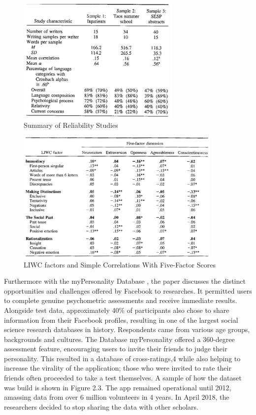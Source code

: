\begin{figure}[H]
\centering
\includegraphics[width=8cm]{Table1}
\caption{Summary of Reliability Studies}
\end{figure}

\begin{figure}[H]
\centering
\includegraphics[width=10cm]{Table2}
\caption{LIWC factors and Simple Correlations With Five-Factor Scores}
\end{figure}
Furthermore with the myPersonality Database \cite{kosinski2015facebook}, the paper discusses the distinct opportunities and challenges offered by Facebook to researches. It permitted users to complete genuine psychometric assessments and receive immediate results. Alongside test data, approximately 40\% of participants also chose to share information from their Facebook profiles, resulting in one of the largest social science research databases in history. Respondents came from various age groups, backgrounds and cultures. The Database myPersonality offered a 360-degree
assessment feature, encouraging users to invite their friends to judge their personality.  This resulted in a database of cross-ratings,4 while also helping to increase the virality of the application; those who were invited to rate their friends often proceeded to take a test themselves. A sample of how the dataset was build is shown in Figure 2.3. The app remained operational until 2012, amassing data from over 6 million volunteers in 4 years. In April 2018, the researchers decided to stop sharing the data with other scholars. 
